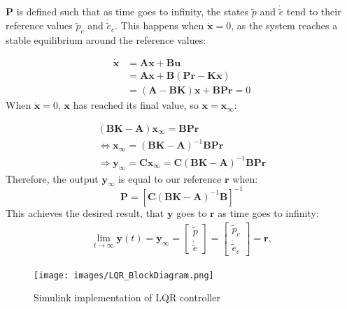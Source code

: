 $\boldsymbol{P}$ is defined such that as time goes to infinity, the
states $\tilde{p}$ and $\dot{\tilde{e}}$ tend to their reference
values $\tilde{p}_c$ and $\dot{\tilde{e}}_c$. This happens when
$\dot{\boldsymbol{x}} = 0$, as the system reaches a stable equilibrium
around the reference values:

\begin{align*}
  \dot{\boldsymbol{x}} &= \boldsymbol{Ax} + \boldsymbol{Bu} \\
                       &= \boldsymbol{Ax} +
                         \boldsymbol{B}(\boldsymbol{Pr} -
                         \boldsymbol{Kx}) \\
                       &= (\boldsymbol{A}-\boldsymbol{BK})\boldsymbol{x}
                         + \boldsymbol{BPr} = 0
\end{align*}
When $\boldsymbol{\dot{x}} = 0$, $\boldsymbol{x}$ has reached its
final value, so $\boldsymbol{x} = \boldsymbol{x_\infty}$:

\begin{align*}
  (\boldsymbol{BK} - \boldsymbol{A})\boldsymbol{x_\infty} = \boldsymbol{BPr} \\
  \Leftrightarrow \boldsymbol{x_\infty} = (\boldsymbol{BK} - \boldsymbol{A})^{-1}\boldsymbol{BPr} \\
  \Rightarrow \boldsymbol{y_\infty} = \boldsymbol{Cx_\infty} = \boldsymbol{C}(\boldsymbol{BK} - \boldsymbol{A})^{-1}\boldsymbol{BPr}
\end{align*}
Therefore, the output $\boldsymbol{y_\infty}$ is equal to our reference $\boldsymbol{r}$ when:
\begin{equation}
  \boldsymbol{P} = [\boldsymbol{C}(\boldsymbol{BK} - \boldsymbol{A})^{-1}\boldsymbol{B}]^{-1}
\end{equation}
This achieves the desired result, that $\boldsymbol{y}$  goes to $\boldsymbol{r}$  as time goes to infinity:
\begin{align*}
  \lim_{t\to\infty}\boldsymbol{y}(t) = \boldsymbol{y_\infty} =
  \begin{bmatrix}
    \tilde{p} \\
    \dot{\tilde{e}}
  \end{bmatrix}
  =
  \begin{bmatrix}
    \tilde{p}_c \\
    \dot{\tilde{e}}_c
  \end{bmatrix}
  = \boldsymbol{r},
\end{align*}

\begin{figure}
\caption{Simulink implementation of LQR controller}
	\centering
		\texttt{[image: images/LQR\_BlockDiagram.png]}
	\label{fig:LQR controller}
\end{figure}

